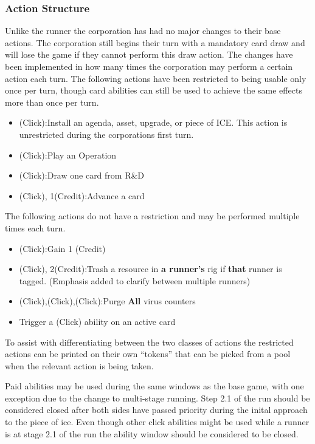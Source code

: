 \documentclass[titlepage]{article}
\begin{document}
\subsubsection{Action Structure}

Unlike the runner the corporation has had no major changes to their base actions. The corporation still begins their turn with a mandatory card draw and will lose the game if they cannot perform this draw action. The changes have been implemented in how many times the corporation may perform a certain action each turn. The following actions have been restricted to being usable only once per turn, though card abilities can still be used to achieve the same effects more than once per turn.
\begin{itemize}
	\item (Click):Install an agenda, asset, upgrade, or piece of ICE. This action is unrestricted during the corporations first turn.
	\item (Click):Play an Operation
	\item (Click):Draw one card from R\&D
	\item (Click), 1(Credit):Advance a card
\end{itemize}

The following actions do not have a restriction and may be performed multiple times each turn.

\begin{itemize}
	\item (Click):Gain 1 (Credit)
	\item (Click), 2(Credit):Trash a resource in \textbf{a runner's} rig if \textbf{that} runner is tagged. (Emphasis added to clarify between multiple runners)
	\item (Click),(Click),(Click):Purge \textbf{All} virus counters
	\item Trigger a (Click) ability on an active card
\end{itemize}

To assist with differentiating between the two classes of actions the restricted actions can be printed on their own ``tokens'' that can be picked from a pool when the relevant action is being taken.

Paid abilities may be used during the same windows as the base game, with one exception due to the change to multi-stage running. Step 2.1 of the run should be considered closed after both sides have passed priority during the inital approach to the piece of ice. Even though other click abilities might be used while a runner is at stage 2.1 of the run the ability window should be considered to be closed.
\end{document}
